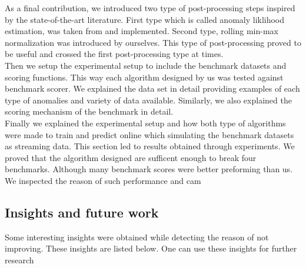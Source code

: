 \documentclass[12pt]{article}
\begin{document}
As a final contribution, we introduced two type of post-processing steps inspired by the state-of-the-art literature. First type which is called anomaly liklihood estimation, was taken from \cite{ahmad2017unsupervised} and implemented. Second type, rolling min-max normalization was introduced by ourselves. This type of post-processing proved to be useful and crossed the first post-processing type at times.\\
\break
Then we setup the experimental setup to include the benchmark datasets and scoring functions. This way each algorithm designed by us was tested against benchmark scorer. We explained the data set in detail providing examples of each type of anomalies and variety of data available. Similarly, we also explained the scoring mechanism of the benchmark in detail. \\
\break
Finally we explained the experimental setup and how both type of algorithms were made to train and predict online which simulating the benchmark datasets as streaming data. This section led to results obtained through experiments. We proved that the algorithm designed are sufficent enough to break four benchmarks. Although many benchmark scores were better preforming than us. We inspected the reason of such performance and cam

\subsection{Insights and future work}
  Some interesting insights were obtained while detecting the reason of not improving. These insights are listed below. One can use these insights for further research
\end{document}
